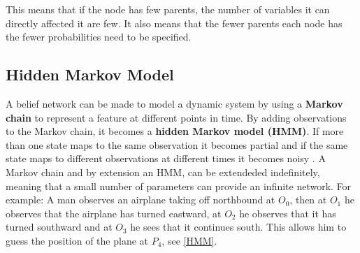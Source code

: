 This means that if the node has few parents, the number of variables it can
directly affected it are few. It also means that the fewer parents each node
has the fewer probabilities need to be specified.

\subsection{Hidden Markov Model}

A belief network can be made to model a dynamic system by using a \textbf{Markov
chain} to represent a feature at different points in time. By adding
observations to the Markov chain, it becomes a \textbf{hidden Markov
model (HMM)}. If more than one state maps to the same observation it
becomes partial and if the same state maps to different observations at
different times it becomes noisy \citep[6.5.2]{MIBook}. A Markov chain and by
extension an HMM, can be extendeded indefinitely, meaning that a small number
of parameters can provide an infinite network\citep[Ch.6.5.1]{MIBook}. For
example: A man observes an airplane taking off northbound at $O_0$, then at
$O_1$ he observes that the airplane has turned eastward, at $O_2$ he observes
that it has turned southward and at $O_3$ he sees that it continues south. This
allows him to guess the position of the plane at $P_4$, see \autoref{HMM}.





% 
